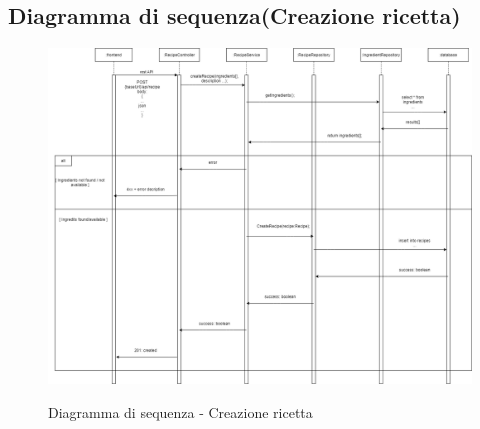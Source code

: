 \documentclass{article}
\begin{document}
\subsection{Diagramma di sequenza(Creazione ricetta)}
\begin{figure}[h!]
\centering
\includegraphics[scale=0.35]{Diagramma di Sequenza.png}
\label{fig:Diagramma di sequenza - Creazione ricetta}
\caption{Diagramma di sequenza - Creazione ricetta}
\end{figure}
\clearpage
\end{document}
